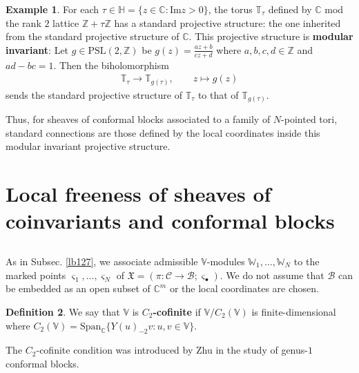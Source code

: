 \documentclass[12pt,a4paper,notitlepage]{article}
\theoremstyle{definition}
\newtheorem{df}{Definition}[section]
\newtheorem{eg}[df]{Example}
\theoremstyle{plain}
\newcommand{\fk}{\mathfrak}
\newcommand{\mc}{\mathcal}
\newcommand{\Span}{\mathrm{Span}}
\newcommand{\sgm}{\varsigma}
\newcommand{\mbb}{\mathbb}
\newcommand{\blt}{\bullet}
\newcommand{\Vbb}{\mathbb V}
\newcommand{\Wbb}{\mathbb W}
\newcommand{\Cbb}{\mathbb C}
\newcommand{\Zbb}{\mathbb Z}
\newcommand{\Hbb}{\mathbb H}
\newcommand{\Imag}{\mathrm{Im}}
\numberwithin{equation}{section}
\begin{document}
\begin{eg}
For each $\tau\in\Hbb=\{z\in\Cbb:\Imag z>0\}$, the torus $\mbb T_\tau$ defined by $\Cbb$ mod the rank $2$ lattice $\Zbb+\tau\Zbb$ has a standard projective structure: the one inherited from the standard projective structure of $\Cbb$. This projective structure is \textbf{modular invariant}: Let $g\in\mathrm{PSL}(2,\Zbb)$ be $g(z)=\frac{az+b}{cz+d}$ where $a,b,c,d\in\Zbb$ and $ad-bc=1$. Then the biholomorphism
\begin{align*}
\mbb T_\tau\rightarrow\mbb T_{g(\tau)},\qquad z\mapsto g(z)
\end{align*}
sends the standard projective structure of $\mbb T_\tau$ to that of $\mbb T_{g(\tau)}$.

Thus, for sheaves of conformal blocks associated to a family of $N$-pointed tori, standard connections are those defined by the local coordinates inside this modular invariant projective structure.  \hfill  \qedsymbol
\end{eg}












\section{Local freeness of sheaves of coinvariants and conformal blocks}\label{lb153}



\subsection{}

As in Subsec. \ref{lb127}, we associate admissible $\Vbb$-modules $\Wbb_1,\dots,\Wbb_N$ to the marked points $\sgm_1,\dots,\sgm_N$ of $\fk X=(\pi:\mc C\rightarrow\mc B;\sgm_\blt)$. We do not assume that $\mc B$ can be embedded as an open subset of $\Cbb^m$ or the local coordinates are chosen.
 
\begin{df}
We say that $\Vbb$ is \textbf{$C_2$-cofinite}  if $\Vbb/C_2(\Vbb)$ is finite-dimensional where  $C_2(\Vbb)=\Span_\Cbb\{Y(u)_{-2}v:u,v\in\Vbb\}$.
\end{df}

The $C_2$-cofinite condition was introduced by Zhu \cite{Zhu96} in the study of genus-$1$ conformal blocks.
\end{document}
